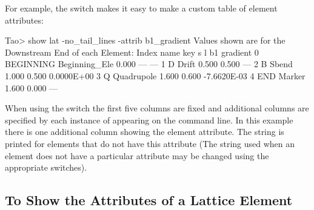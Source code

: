 \documentclass{hitec}     %
\begin{document}
For example, the  switch makes it easy to make a custom table of element attributes:
\begin{code}  
Tao> show lat -no_tail_lines -attrib b1_gradient 
 Values shown are for the Downstream End of each Element:
 Index  name      key                      s       l          b1
                                                        gradient
      0  BEGINNING Beginning_Ele        0.000     ---         ---
      1  D         Drift                0.500   0.500         ---
      2  B         Sbend                1.000   0.500  0.0000E+00
      3  Q         Quadrupole           1.600   0.600 -7.6620E-03
      4  END       Marker               1.600   0.000         ---
\end{code}
When using the  switch the first five columns are fixed and additional columns are
specified by each instance of  appearing on the command line. In this example there
is one additional column showing the  element attribute. The string \vn{---} is
printed for elements that do not have this attribute (The string used when an element does not have
a particular attribute may be changed using the appropriate  switches).

\newpage

\subsection{To Show the Attributes of a Lattice Element}
\end{document}
